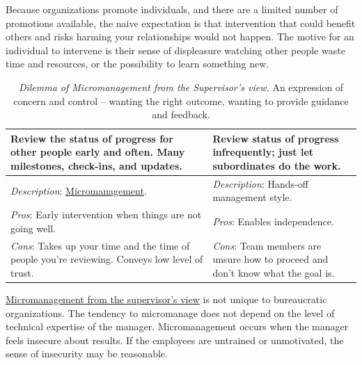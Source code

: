 Because organizations promote individuals, and there are a limited number of promotions available, the naive expectation is that intervention that could benefit others and risks harming your relationships would not happen. The motive for an individual to intervene is their sense of displeasure watching other people waste time and resources, or the possibility to learn something new.


\begin{center}
\begin{table}[H] %
\begin{tabular}{ | m{\dilemmatablewidth}| m{\dilemmatablewidth} | } 
  \hline
  \textbf{Review the status of progress for other people early and often. Many milestones, check-ins, and updates.} &
  \textbf{Review status of progress infrequently; just let subordinates do the work.} \\
  \hline
  \textit{Description}: \href{https://en.wikipedia.org/wiki/Micromanagement}{Micromanagement}. 
  \index{Wikipedia!\href{https://en.wikipedia.org/wiki/Micromanagement}{Micromanagement}}
  & 
  \textit{Description}: Hands-off management style. \\
  \hline
  \textit{Pros}: Early intervention when things are not going well. & 
  \textit{Pros}: Enables independence. \\
  \hline
  \textit{Cons}: Takes up your time and the time of people you're reviewing. Conveys low level of trust. & 
  \textit{Cons}: Team members are unsure how to proceed and don't know what the goal is. \\
  \hline
\end{tabular}
\caption{\textit{Dilemma of Micromanagement from the Supervisor's view.}
An expression of concern and control -- wanting the right outcome, wanting to provide guidance and feedback. 
}
\label{table:micromanaging}
\end{table}
\end{center}

\hyperref[table:micromanaging]{Micromanagement from the supervisor's view} is not unique to bureaucratic organizations. The tendency to micromanage does not depend on the level of technical expertise of the manager. Micromanagement occurs when the manager feels insecure about results. If the employees are untrained or unmotivated, the sense of insecurity may be reasonable.

